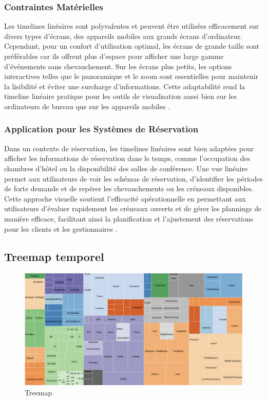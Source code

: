 \documentclass[runningheads]{llncs}
\begin{document}
\subsubsection{Contraintes Matérielles}
Les timelines linéaires sont polyvalentes et peuvent être utilisées efficacement sur divers types d'écrans, des appareils mobiles aux grands écrans d'ordinateur. Cependant, pour un confort d'utilisation optimal, les écrans de grande taille sont préférables car ils offrent plus d'espace pour afficher une large gamme d'événements sans chevauchement. Sur les écrans plus petits, les options interactives telles que le panoramique et le zoom sont essentielles pour maintenir la lisibilité et éviter une surcharge d'informations. Cette adaptabilité rend la timeline linéaire pratique pour les outils de visualisation aussi bien sur les ordinateurs de bureau que sur les appareils mobiles \cite{brehmer_timelines_2017}.

\subsubsection{Application pour les Systèmes de Réservation}
Dans un contexte de réservation, les timelines linéaires sont bien adaptées pour afficher les informations de réservation dans le temps, comme l'occupation des chambres d'hôtel ou la disponibilité des salles de conférence. Une vue linéaire permet aux utilisateurs de voir les schémas de réservation, d'identifier les périodes de forte demande et de repérer les chevauchements ou les créneaux disponibles. Cette approche visuelle soutient l'efficacité opérationnelle en permettant aux utilisateurs d'évaluer rapidement les créneaux ouverts et de gérer les plannings de manière efficace, facilitant ainsi la planification et l'ajustement des réservations pour les clients et les gestionnaires \cite{brehmer_timelines_2017}.

\subsection{Treemap temporel}
\begin{figure}
    \centering
    \includegraphics[width=1\linewidth]{assets/overview_treemap.png}
    \caption{Treemap \cite{figueiras_towards_2015}}
    \label{fig:enter-label}
\end{figure}
\end{document}
